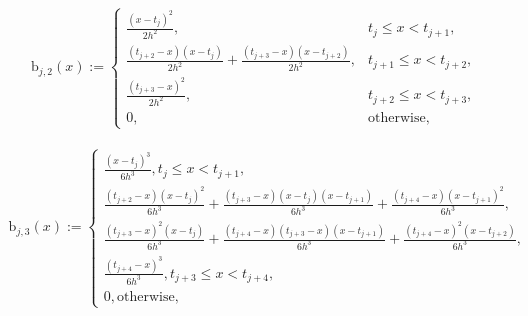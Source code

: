 \documentclass{iitthesis}
\theoremstyle{definition}
\theoremstyle{remark}
\begin{document}
\begin{align*}
  \text{b}_{j,2}(x):= \begin{cases} \displaystyle \frac{(x-t_{j})^2}{2h^2}, & t_{j} \le x < t_{j+1},\\[1ex]
\displaystyle \frac{(t_{j+2}-x)(x-t_{j})}{2h^2}+\frac{(t_{j+3}-x)(x-t_{j+2})}{2h^2}, & t_{j+1} \le x < t_{j+2},\\[1ex]
\displaystyle \frac{(t_{j+3}-x)^2}{2h^2}, & t_{j+2} \le x < t_{j+3},\\[1ex]
\displaystyle  0, & \text{otherwise},
\end{cases}
\end{align*}


\begin{align*}
  \text{b}_{j,3}(x):= \begin{cases} \displaystyle \frac{(x-t_{j})^3}{6h^3}, t_{j} \le x < t_{j+1},\\[1ex]
\displaystyle \frac{(t_{j+2}-x)(x-t_{j})^2}{6h^3}+\frac{(t_{j+3}-x)(x-t_{j})(x-t_{j+1})}{6h^3}+\frac{(t_{j+4}-x)(x-t_{j+1})^2}{6h^3}, \\[1ex]
\displaystyle \frac{(t_{j+3}-x)^2(x-t_{j})}{6h^3}+\frac{(t_{j+4}-x)(t_{j+3}-x)(x-t_{j+1})}{6h^3}+\frac{(t_{j+4}-x)^2(x-t_{j+2})}{6h^3}, \\[1ex]
\displaystyle \frac{(t_{j+4}-x)^3}{6h^3}, t_{j+3} \le x < t_{j+4},\\[1ex]
\displaystyle  0, \text{otherwise},
\end{cases}
\end{align*}
\end{document}
